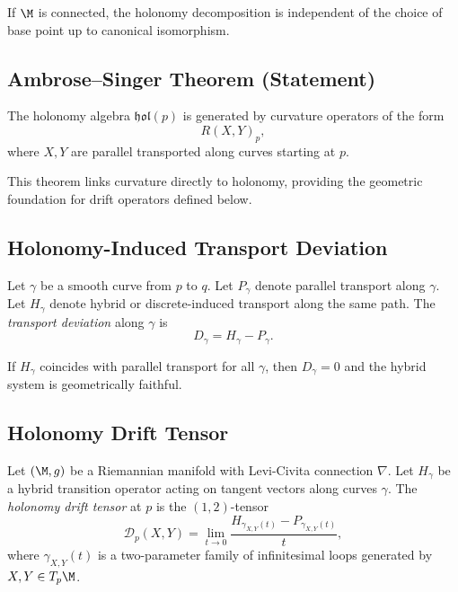 \begin{lemma}
If $\M$ is connected, the holonomy decomposition is independent of the
choice of base point up to canonical isomorphism.
\end{lemma}

\subsection{Ambrose--Singer Theorem (Statement)}

\begin{theorem}
The holonomy algebra $\mathfrak{hol}(p)$ is generated by curvature
operators of the form
\[
R(X,Y)_p,
\]
where $X,Y$ are parallel transported along curves starting at $p$.
\end{theorem}

\begin{remark}
This theorem links curvature directly to holonomy, providing the geometric
foundation for drift operators defined below.
\end{remark}

\subsection{Holonomy-Induced Transport Deviation}

\begin{definition}
Let $\gamma$ be a smooth curve from $p$ to $q$.  
Let $P_\gamma$ denote parallel transport along $\gamma$.  
Let $H_\gamma$ denote hybrid or discrete-induced transport along the same
path.  
The \emph{transport deviation} along $\gamma$ is
\[
D_\gamma = H_\gamma - P_\gamma.
\]
\end{definition}

\begin{lemma}
If $H_\gamma$ coincides with parallel transport for all $\gamma$, then
$D_\gamma = 0$ and the hybrid system is geometrically faithful.
\end{lemma}

\subsection{Holonomy Drift Tensor}

\begin{definition}
Let $(\M,g)$ be a Riemannian manifold with Levi-Civita connection $\nabla$.
Let $H_\gamma$ be a hybrid transition operator acting on tangent vectors
along curves $\gamma$.  
The \emph{holonomy drift tensor} at $p$ is the $(1,2)$-tensor
\[
\mathcal{D}_p(X,Y)
= \lim_{t \to 0}
\frac{H_{\gamma_{X,Y}(t)} - P_{\gamma_{X,Y}(t)}}{t},
\]
where $\gamma_{X,Y}(t)$ is a two-parameter family of infinitesimal loops
generated by $X,Y \in T_p\M$.
\end{definition}

